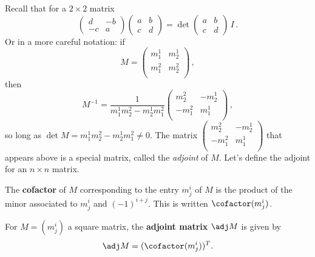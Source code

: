 Recall that for a $2\times 2$ matrix 
\[
\begin{pmatrix}d & -b \\ -c & a\end{pmatrix}\begin{pmatrix}a & b \\ c & d\end{pmatrix}
=\det \begin{pmatrix}a & b \\ c & d\end{pmatrix}\, I\, .
\]
Or in a more careful notation: if
\[M=\begin{pmatrix}
m^1_1 & m^1_2 \\[1mm]
m^2_1 & m^2_2 \\
\end{pmatrix}\, ,\] 
then \[M^{-1}=\frac{1}{m^1_1m^2_2-m^1_2m^2_1}\begin{pmatrix}
m^2_2 & -m^1_2 \\
-m^2_1 & m^1_1 \\
\end{pmatrix}\, ,\]
so long as $\det M=m^1_1m^2_2-m^1_2m^2_1\neq 0$.
  The  matrix $\begin{pmatrix}
m^2_2 & -m^1_2 \\
-m^2_1 & m^1_1 \\
\end{pmatrix}$ that appears above is a special matrix, called the \emph{adjoint} of $M$.  Let's define the adjoint for an $n \times n$ matrix.


The {\bfseries cofactor} of $M$ corresponding to the entry $m^i_j$ of $M$ 
is the product of the minor associated to $m^i_j$
and $(-1)^{i+j}$.  This is written $\cofactor(m^i_j)$.

\begin{definition}
For $M=(m^i_j)$ a square matrix, the {\bfseries adjoint matrix} $\adj M$ is given by
\[
\adj M = (\cofactor(m^i_j))^T.
\]
\end{definition}

